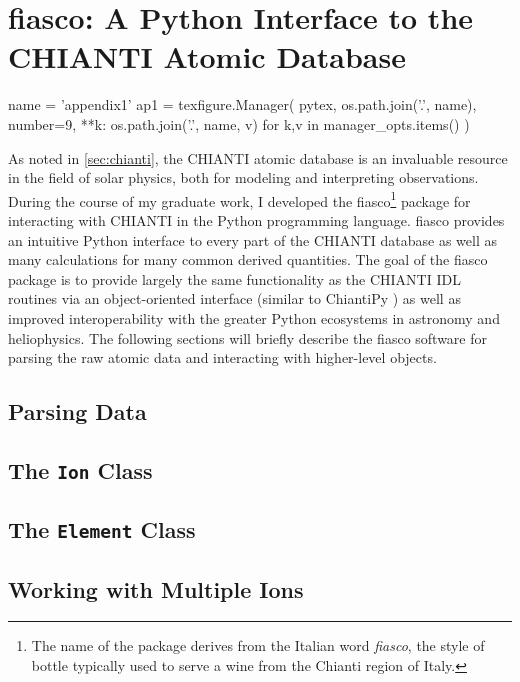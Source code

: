 \chapter{fiasco: A Python Interface to the CHIANTI Atomic Database}\label{ap:fiasco}

\begin{pycode}[appendix1]
name = 'appendix1'
ap1 = texfigure.Manager(
    pytex,
    os.path.join('.', name),
    number=9,
    **{k: os.path.join('.', name, v) for k,v in manager_opts.items()}
)
\end{pycode}

As noted in \autoref{sec:chianti}, the CHIANTI atomic database is an invaluable resource in the field of solar physics, both for modeling and interpreting observations. During the course of my graduate work, I developed the fiasco\footnote{The name of the package derives from the Italian word \textit{fiasco}, the style of bottle typically used to serve a wine from the Chianti region of Italy.} package for interacting with CHIANTI in the Python programming language. fiasco provides an intuitive Python interface to every part of the CHIANTI database as well as many calculations for many common derived quantities. The goal of the fiasco package is to provide largely the same functionality as the CHIANTI IDL routines via an object-oriented interface (similar to ChiantiPy \citep{landi_chiantiatomic_2012,barnes_chiantipy_2017}) as well as improved interoperability with the greater Python ecosystems in astronomy and heliophysics. The following sections will briefly describe the fiasco software for parsing the raw atomic data and interacting with higher-level objects.

\section{Parsing Data}\label{sec:parsing-chianti}

\section{The \texttt{Ion} Class}\label{sec:fiasco-ion}

\section{The \texttt{Element} Class}\label{sec:fiasco-element}

\section{Working with Multiple Ions}\label{sec:ion-collection}

